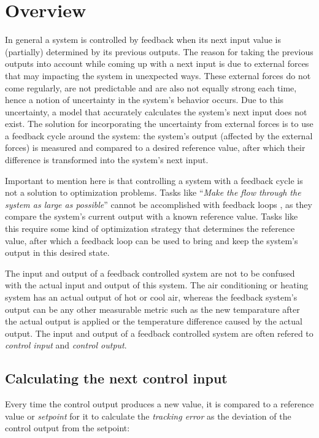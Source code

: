 \section{Overview}
In general a system is controlled by feedback when its next input value is (partially) determined by its previous outputs. The reason for taking the previous outputs into account while coming up with a next input is due to external forces that may impacting the system in unexpected ways. These external forces do not come regularly, are not predictable and are also not equally strong each time, hence a notion of uncertainty in the system's behavior occurs. Due to this uncertainty, a model that accurately calculates the system's next input does not exist. The solution for incorporating the uncertainty from external forces is to use a feedback cycle around the system: the system's output (affected by the external forces) is measured and compared to a desired reference value, after which their difference is transformed into the system's next input.

Important to mention here is that controlling a system with a feedback cycle is not a solution to optimization problems. Tasks like ``\textit{Make the flow through the system as large as possible}'' cannot be accomplished with feedback loops \cite{janert2013-feedback}, as they compare the system's current output with a known reference value. Tasks like this require some kind of optimization strategy that determines the reference value, after which a feedback loop can be used to bring and keep the system's output in this desired state.

The input and output of a feedback controlled system are not to be confused with the actual input and output of this system. The air conditioning or heating system has an actual output of hot or cool air, whereas the feedback system's output can be any other measurable metric such as the new temparature after the actual output is applied or the temperature difference caused by the actual output. The input and output of a feedback controlled system are often refered to \textit{control input} and \textit{control output}.

\subsection{Calculating the next control input}
Every time the control output produces a new value, it is compared to a reference value or \textit{setpoint} for it to calculate the \textit{tracking error} as the deviation of the control output from the setpoint:

